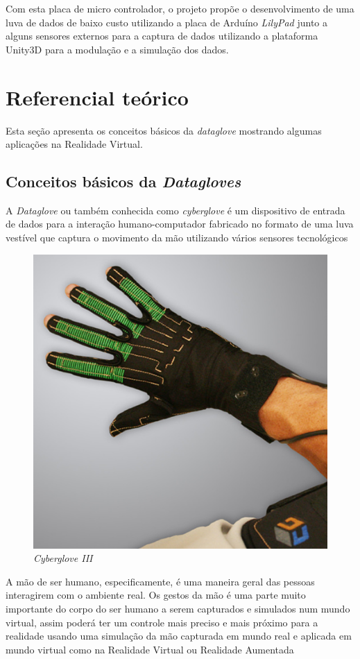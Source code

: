\documentclass[12pt]{article}
\begin{document}
Com esta placa de micro controlador, o projeto propõe o desenvolvimento de uma luva de dados de baixo custo utilizando a placa de Arduíno \textit{LilyPad} junto a alguns sensores externos para a captura de dados utilizando a plataforma Unity3D para a modulação e a simulação dos dados.


\section{Referencial teórico} \label{sec:fundamentosDatagloves}

Esta seção apresenta os conceitos básicos da \textit{dataglove} mostrando algumas aplicações na Realidade Virtual.

\subsection{Conceitos básicos da \textit{Datagloves}}

A \textit{Dataglove} ou também conhecida como \textit{cyberglove} é um dispositivo de entrada de dados para a interação humano-computador fabricado no formato de uma luva vestível que captura o movimento da mão utilizando vários sensores tecnológicos \cite{buscher_2012}

\begin{figure}[H]
    \centering
    \includegraphics[width=.7\textwidth]{images/cg3-thumb.jpeg}
    \caption{\textit{Cyberglove III}}
    \label{fig:cyberglove3-1}
\end{figure}

A mão de ser humano, especificamente, é uma maneira geral das pessoas interagirem com o ambiente real. Os gestos da mão é uma parte muito importante do corpo do ser humano a serem capturados e simulados num mundo virtual, assim poderá ter um controle mais preciso e mais próximo para a realidade usando uma simulação da mão capturada em mundo real e aplicada em mundo virtual como na Realidade Virtual ou Realidade Aumentada \cite{linn_2017}
\end{document}

